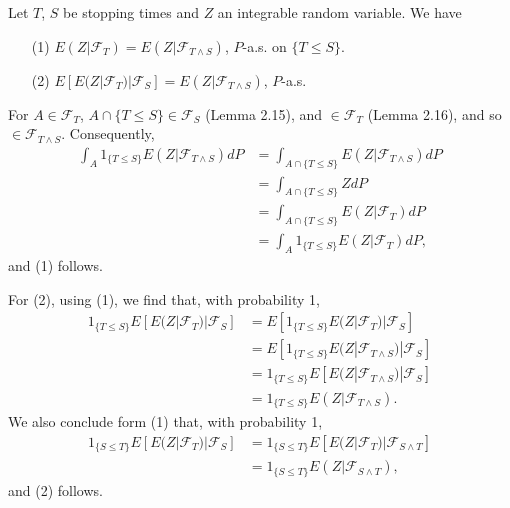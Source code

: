 \documentclass{report}
\begin{document}
\setcounter{exe}{16}
\begin{prob}
	Let \( T \), \( S \) be stopping times and \( Z \) an integrable random variable. We have
	\begin{itemize}
		\item[(1)] \( E(Z|\mathscr{F}_T)=E(Z|\mathscr{F}_{T\wedge S}) \), \( P \)-a.s. on \( \{T\le S\} \).
		\item[(2)] \( E[E(Z|\mathscr{F}_T)|\mathscr{F}_S]=E(Z|\mathscr{F}_{T\wedge S}) \), \( P \)-a.s.
	\end{itemize}
\end{prob}
\begin{prf}
	For \( A\in \mathscr{F}_T \), \( A \cap \{T\le S\}\in \mathscr{F}_S \) (Lemma 2.15), and \( \in \mathscr{F}_T \) (Lemma 2.16), and so \( \in \mathscr{F}_{T\wedge S} \). Consequently,
	\begin{align*}
		\int_A 1_{\{T\le S\}}E(Z|\mathscr{F}_{T\wedge S})dP
		 & =\int_{A\cap \{T\le S\}}E(Z|\mathscr{F}_{T\wedge S})dP \\
		 & =\int_{A\cap \{T\le S\}}Z dP                           \\
		 & =\int_{A\cap \{T\le S\}}E(Z|\mathscr{F}_{T})dP         \\
		 & =\int_{A}1_{\{T\le S\}}E(Z|\mathscr{F}_{T})dP,
	\end{align*}
	and (1) follows.
	
	For (2), using (1), we find that, with probability 1,
	\begin{align*}
		1_{\{T\le S\}}E[E(Z|\mathscr{F}_T)|\mathscr{F}_S]
		 & =E[1_{\{T\le S\}}E(Z|\mathscr{F}_T)|\mathscr{F}_S]           \\
		 & =E[1_{\{T\le S\}}E(Z|\mathscr{F}_{T\wedge S})|\mathscr{F}_S] \\
		 & =1_{\{T\le S\}}E[E(Z|\mathscr{F}_{T\wedge S})|\mathscr{F}_S] \\
		 & =1_{\{T\le S\}}E(Z|\mathscr{F}_{T\wedge S}).
	\end{align*}
	We also conclude form (1) that, with probability 1,
	\begin{align*}
		1_{\{S\le T\}}E[E(Z|\mathscr{F}_T)|\mathscr{F}_S]
		 & =1_{\{S\le T\}}E[E(Z|\mathscr{F}_T)|\mathscr{F}_{S\wedge T}] \\
		 & =1_{\{S\le T\}}E(Z|\mathscr{F}_{S\wedge T}),
	\end{align*}
	and (2) follows.
\end{prf}
\end{document}
